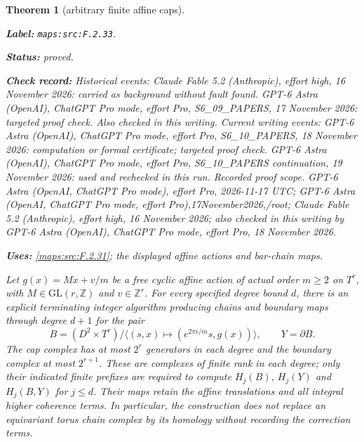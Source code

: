 \documentclass[11pt,a4paper]{article}
\newtheorem{theorem}{Theorem}[section]
\theoremstyle{definition}
\newcommand{\StatementRecord}[4]{\par\smallskip\begingroup\upshape\raggedright\noindent\textbf{Label:} \nolinkurl{#1}.\par\noindent\textbf{Status:} #2.\par\noindent\textbf{Check record:} #3.\par\noindent\textbf{Uses:} #4.\par\endgroup\smallskip}
\begin{document}
\begin{theorem}[arbitrary finite affine caps]\label{maps:src:F.2.33}
\StatementRecord{maps:src:F.2.33}{proved}{Historical events: Claude Fable 5.2 (Anthropic), effort high, 16 November 2026: carried as background without fault found. GPT-6 Astra (OpenAI), ChatGPT Pro mode, effort Pro, S6\_09\_PAPERS, 17 November 2026: targeted proof check. Also checked in this writing. Current writing events: GPT-6 Astra (OpenAI), ChatGPT Pro mode, effort Pro, S6\_10\_PAPERS, 18 November 2026: computation or formal certificate; targeted proof check. GPT-6 Astra (OpenAI), ChatGPT Pro mode, effort Pro, S6\_10\_PAPERS continuation, 19 November 2026: used and rechecked in this run. \emph{Recorded proof scope.} GPT-6 Astra (OpenAI, ChatGPT Pro mode), effort Pro, 2026-11-17 UTC; GPT-6 Astra (OpenAI, ChatGPT Pro mode, effort Pro),17November2026,/root; Claude Fable 5.2 (Anthropic), effort high, 16 November 2026; also checked in this writing by GPT-6 Astra (OpenAI), ChatGPT Pro mode, effort Pro, 18 November 2026}{\cref{maps:src:F.2.31}; the displayed affine actions and bar-chain maps}


Let $g(x)=Mx+v/m$ be a free cyclic affine action of actual order
$m\geq2$ on $T^r$, with $M\in\mathrm{GL}(r,\mathbb Z)$ and
$v\in\mathbb Z^r$.  For every specified degree bound $d$, there is
an explicit terminating integer algorithm producing chains and
boundary maps through degree $d+1$ for the pair
\[
 B=(D^2\times T^r)/\langle(s,x)\mapsto
 (e^{2\pi i/m}s,g(x))\rangle,
 \qquad Y=\partial B.                                      \tag{F.CA1}\label{maps:eq:F.CA1}
\]
The cap complex has at most $2^r$ generators in each degree and
the boundary complex at most $2^{r+1}$.  These are complexes of
finite rank in each degree; only their indicated finite prefixes
are required to compute $H_j(B)$, $H_j(Y)$ and $H_j(B,Y)$ for
$j\leq d$.  Their maps retain the affine translations and all
integral higher coherence terms.  In particular, the construction
does not replace an equivariant torus chain complex by its
homology without recording the correction terms.

\end{theorem}
\end{document}
